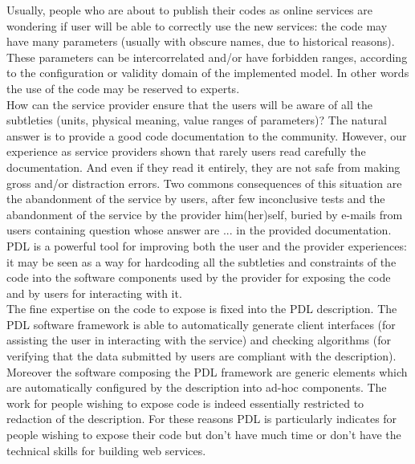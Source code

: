 \documentclass[a4paper,11pt] {ivoa}
\begin{document}
 Usually, people who are about to publish their codes as online services are wondering if user will be able to correctly use the new services: the code may have many parameters (usually with obscure names,  due to historical reasons). These parameters can be intercorrelated and/or have forbidden ranges, according to the configuration or validity domain of the implemented model. In other words the use of the code may be reserved to experts.\\
How can the service provider ensure that the users will be aware of all the subtleties (units, physical meaning, value ranges of parameters)? The natural answer is to provide a good code documentation to the community. However, our experience as service providers shown that rarely users read carefully the documentation. And even if they read it entirely, they are not safe from making gross and/or distraction errors. 
Two commons consequences of this situation are the abandonment of the service by users, after few inconclusive tests and
the abandonment of the service by the provider him(her)self, buried by e-mails from users containing question whose answer are ... in the provided documentation.\\
PDL is a powerful tool for improving both the user and the provider experiences: it may be seen as a way for hardcoding all the subtleties and constraints of the code into the software components used by the provider for exposing the code and by users for interacting with it.\\
The fine expertise on the code to expose is fixed into the PDL description. The PDL software framework is able to automatically generate client interfaces (for assisting the user in interacting with the service) and checking algorithms (for verifying that the data submitted by users are compliant with the description). Moreover the software composing the PDL framework are generic elements which are automatically configured by the description into ad-hoc components. The work for people wishing to expose code is indeed essentially restricted to redaction of the description. For these reasons PDL is particularly indicates for people wishing to expose their code but  don't have much time or don't have the technical skills for building web services.\\
\end{document}
